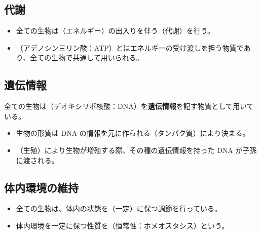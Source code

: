 \subsection{代謝}
\begin{itemize}\setlength{\leftskip}{-1.00zw}%
\item[\ajMaru{1}] 全ての生物は（\textcolor{black!10}{エネルギー}）の出入りを伴う（\textcolor{black!10}{代謝}）を行う。\enlargethispage{0.50zw}
\item[\ajMaru{2}]（\textcolor{black!10}{アデノシン三リン酸：ATP}）とはエネルギーの受け渡しを担う物質であり、全ての生物で共通して用いられる。
\end{itemize}
\subsection{遺伝情報}
全ての生物は（\textcolor{black!10}{デオキシリボ核酸：DNA}）を\textbf{遺伝情報}を記す物質として用いている。
\begin{itemize}\setlength{\leftskip}{-1.00zw}%
\item[\ajMaru{1}] 生物の形質は DNA の情報を元に作られる（\textcolor{black!10}{タンパク質}）により決まる。
\item[\ajMaru{2}]（\textcolor{black!10}{生殖}）により生物が増殖する際、その種の遺伝情報を持った DNA が子孫に渡される。
\end{itemize}
\subsection{体内環境の維持}
\begin{itemize}\setlength{\leftskip}{-1.00zw}%
\item[\ajMaru{1}] 全ての生物は、体内の状態を（\textcolor{black!10}{一定}）に保つ調節を行っている。
\item[\ajMaru{2}] 体内環境を一定に保つ性質を（\textcolor{black!10}{恒常性：ホメオスタシス}）という。
\end{itemize}
